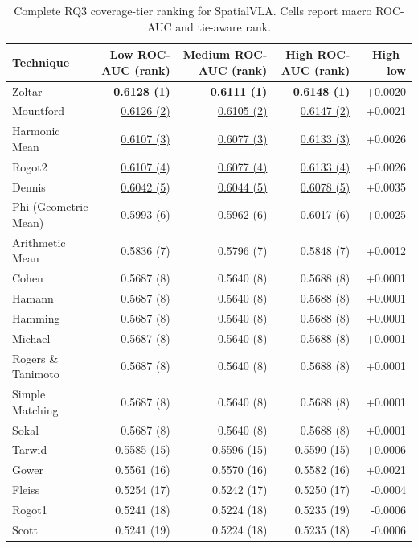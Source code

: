 \begin{table}[t]
\centering
\caption{Complete RQ3 coverage-tier ranking for SpatialVLA. Cells report macro ROC-AUC and tie-aware rank.}
\label{tab:rq3-supplementary-rankings-spatialvla}
{\scriptsize
\setlength{\tabcolsep}{5pt}
\begin{tabular}{lrrrr}
\toprule
Technique & Low ROC-AUC (rank) & Medium ROC-AUC (rank) & High ROC-AUC (rank) & High--low \\
\midrule
Zoltar & \textbf{0.6128 (1)} & \textbf{0.6111 (1)} & \textbf{0.6148 (1)} & +0.0020 \\
Mountford & \underline{0.6126 (2)} & \underline{0.6105 (2)} & \underline{0.6147 (2)} & +0.0021 \\
Harmonic Mean & \underline{0.6107 (3)} & \underline{0.6077 (3)} & \underline{0.6133 (3)} & +0.0026 \\
Rogot2 & \underline{0.6107 (4)} & \underline{0.6077 (4)} & \underline{0.6133 (4)} & +0.0026 \\
Dennis & \underline{0.6042 (5)} & \underline{0.6044 (5)} & \underline{0.6078 (5)} & +0.0035 \\
Phi (Geometric Mean) & 0.5993 (6) & 0.5962 (6) & 0.6017 (6) & +0.0025 \\
Arithmetic Mean & 0.5836 (7) & 0.5796 (7) & 0.5848 (7) & +0.0012 \\
Cohen & 0.5687 (8) & 0.5640 (8) & 0.5688 (8) & +0.0001 \\
Hamann & 0.5687 (8) & 0.5640 (8) & 0.5688 (8) & +0.0001 \\
Hamming & 0.5687 (8) & 0.5640 (8) & 0.5688 (8) & +0.0001 \\
Michael & 0.5687 (8) & 0.5640 (8) & 0.5688 (8) & +0.0001 \\
Rogers \& Tanimoto & 0.5687 (8) & 0.5640 (8) & 0.5688 (8) & +0.0001 \\
Simple Matching & 0.5687 (8) & 0.5640 (8) & 0.5688 (8) & +0.0001 \\
Sokal & 0.5687 (8) & 0.5640 (8) & 0.5688 (8) & +0.0001 \\
Tarwid & 0.5585 (15) & 0.5596 (15) & 0.5590 (15) & +0.0006 \\
Gower & 0.5561 (16) & 0.5570 (16) & 0.5582 (16) & +0.0021 \\
Fleiss & 0.5254 (17) & 0.5242 (17) & 0.5250 (17) & -0.0004 \\
Rogot1 & 0.5241 (18) & 0.5224 (18) & 0.5235 (19) & -0.0006 \\
Scott & 0.5241 (19) & 0.5224 (18) & 0.5235 (18) & -0.0006 \\

\end{tabular}}
\end{table}
